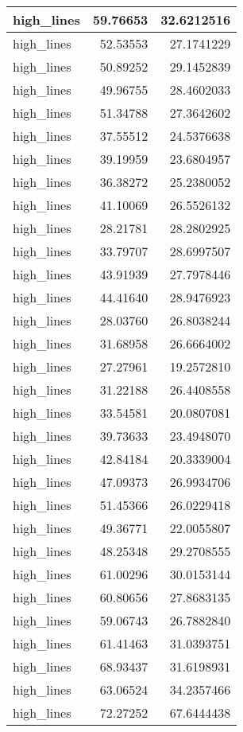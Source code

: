 \documentclass[
]{book}
\theoremstyle{definition}
\theoremstyle{definition}
\theoremstyle{definition}
\theoremstyle{definition}
\theoremstyle{remark}
\begin{document}
\begin{tabular}{l|r|r}
\hline
high\_lines & 59.76653 & 32.6212516\\
\hline
high\_lines & 52.53553 & 27.1741229\\
\hline
high\_lines & 50.89252 & 29.1452839\\
\hline
high\_lines & 49.96755 & 28.4602033\\
\hline
high\_lines & 51.34788 & 27.3642602\\
\hline
high\_lines & 37.55512 & 24.5376638\\
\hline
high\_lines & 39.19959 & 23.6804957\\
\hline
high\_lines & 36.38272 & 25.2380052\\
\hline
high\_lines & 41.10069 & 26.5526132\\
\hline
high\_lines & 28.21781 & 28.2802925\\
\hline
high\_lines & 33.79707 & 28.6997507\\
\hline
high\_lines & 43.91939 & 27.7978446\\
\hline
high\_lines & 44.41640 & 28.9476923\\
\hline
high\_lines & 28.03760 & 26.8038244\\
\hline
high\_lines & 31.68958 & 26.6664002\\
\hline
high\_lines & 27.27961 & 19.2572810\\
\hline
high\_lines & 31.22188 & 26.4408558\\
\hline
high\_lines & 33.54581 & 20.0807081\\
\hline
high\_lines & 39.73633 & 23.4948070\\
\hline
high\_lines & 42.84184 & 20.3339004\\
\hline
high\_lines & 47.09373 & 26.9934706\\
\hline
high\_lines & 51.45366 & 26.0229418\\
\hline
high\_lines & 49.36771 & 22.0055807\\
\hline
high\_lines & 48.25348 & 29.2708555\\
\hline
high\_lines & 61.00296 & 30.0153144\\
\hline
high\_lines & 60.80656 & 27.8683135\\
\hline
high\_lines & 59.06743 & 26.7882840\\
\hline
high\_lines & 61.41463 & 31.0393751\\
\hline
high\_lines & 68.93437 & 31.6198931\\
\hline
high\_lines & 63.06524 & 34.2357466\\
\hline
high\_lines & 72.27252 & 67.6444438\\

\end{tabular}
\end{document}
